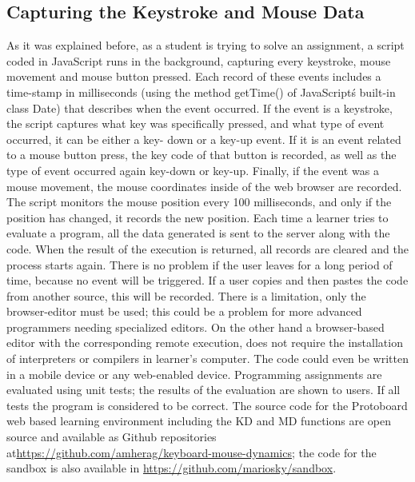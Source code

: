 \documentclass[a4paper,twoside]{article}
\begin{document}
\subsection{Capturing the Keystroke and Mouse Data}
As it was explained before, as a student is trying to solve an assignment,
a script coded in JavaScript runs in the background,
capturing every keystroke, mouse movement and mouse button pressed. Each record
of these events includes a time-stamp in milliseconds (using the method
getTime() of JavaScript\'s built-in class Date) that describes when the event
occurred. If the event is a keystroke, the script captures what key was
specifically pressed, and what type of event occurred, it can be either a key-
down or a key-up event. If it is an event related to a mouse button press, the
key code of that button is recorded, as well as the type of event occurred again
key-down or key-up. Finally, if the event was a mouse movement, the mouse
coordinates inside of the web browser are recorded. The script monitors the
mouse position every 100 milliseconds, and only if the position has changed, it
records the new position. Each time a learner tries to evaluate a program, all
the data generated is sent to the server along with the code. When the result of
the execution is returned, all records are cleared and the process starts again.
There is no problem if the user leaves for a long period of time, because no
event will be triggered. If a user copies and then pastes the code from another
source, this will be recorded. There is a limitation, only the browser-editor
must be used; this could be a problem for more advanced programmers needing
specialized editors.  On the other hand a browser-based editor with the
corresponding remote execution, does not require the installation of
interpreters or compilers in learner’s computer. The code could even be written
in a mobile device or any web-enabled device. Programming assignments are
evaluated using unit tests; the results of the evaluation are shown to users.
If all tests the program is considered to be correct. The source code for the
Protoboard web based learning environment including the KD and MD functions are
open source and available as Github repositories
at\url{https://github.com/amherag/keyboard-mouse-dynamics}; the code for the
sandbox is also available in \url{https://github.com/mariosky/sandbox}.
\end{document}
